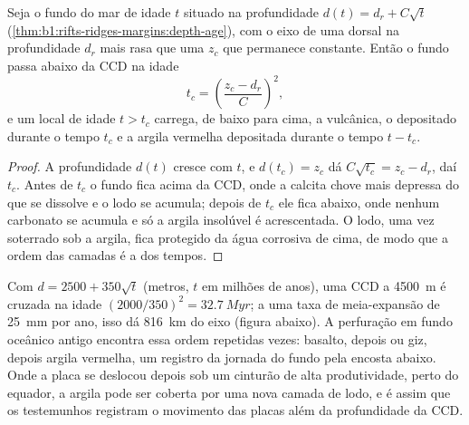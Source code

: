 \begin{proposition}\label{prop:b1:chemical-biogenic-sediments:flank}
Seja o fundo do mar de idade $t$ situado na profundidade $d(t) = d_r + C\sqrt t$
(\cref{thm:b1:rifts-ridges-margins:depth-age}), com o eixo de uma dorsal na profundidade
$d_r$ mais rasa que uma  $z_c$ que permanece
constante. Então o fundo passa abaixo da CCD na idade
\[
t_c = \left(\frac{z_c - d_r}{C}\right)^2 ,
\]
e um local de idade $t > t_c$ carrega, de baixo para cima, a  vulcânica, o  depositado durante o tempo $t_c$ e a argila vermelha depositada durante o tempo
$t - t_c$.
\end{proposition}

\begin{proof}
A profundidade $d(t)$ cresce com $t$, e $d(t_c) = z_c$ dá $C\sqrt{t_c} =
z_c - d_r$, daí
$t_c$. Antes de $t_c$ o fundo fica acima da CCD, onde a calcita chove mais depressa do que
se dissolve e o lodo se acumula; depois de $t_c$ ele fica abaixo, onde nenhum carbonato se
acumula e só a argila insolúvel é acrescentada. O lodo, uma vez soterrado sob a argila,
fica protegido da água corrosiva de cima, de modo que a ordem das camadas é a dos tempos.
\end{proof}

Com $d = 2500 + 350\sqrt t$ (metros, $t$ em milhões de anos), uma CCD a \qty{4500}{m} é
cruzada na idade $(2000/350)^2 = \qty{32.7}{Myr}$; a uma taxa de meia-expansão de
\qty{25}{mm} por ano, isso dá \qty{816}{km} do eixo (figura abaixo). A perfuração em fundo
oceânico antigo
encontra essa ordem repetidas vezes: basalto, depois  ou giz, depois argila
vermelha, um registro da jornada do fundo pela encosta abaixo. Onde a placa se deslocou
depois sob um cinturão de alta produtividade, perto do equador, a argila pode ser coberta
por uma nova camada de lodo, e é assim que os testemunhos registram o movimento das placas
além da profundidade da CCD.

